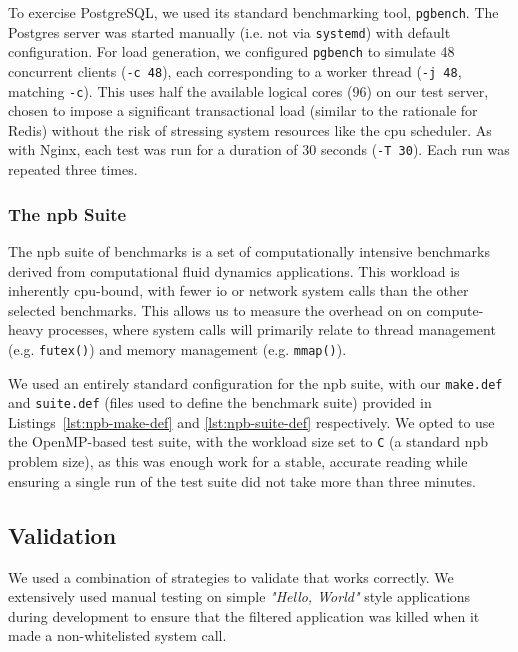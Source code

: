 To exercise PostgreSQL, we used its standard benchmarking tool, 
\texttt{pgbench}. The Postgres server was started manually (i.e. not via
\texttt{systemd}) with default configuration. For load generation, we configured 
\texttt{pgbench} to simulate 48 concurrent clients (\texttt{-c 48}), each
corresponding to a worker thread (\texttt{-j 48}, matching \texttt{-c}).
This uses half the available logical cores (96) on our
test server, chosen to impose a significant transactional load (similar to
the rationale for Redis) without the risk of stressing system resources like the
\ac{cpu} scheduler. As with Nginx, each test was run for a duration of 30
seconds (\texttt{-T 30}). Each run was repeated three times.

\subsubsection{The \ac{npb} Suite}\label{subsubsec:npb-just}

The \acl{npb} suite of benchmarks is a set of computationally intensive 
benchmarks derived from computational fluid dynamics applications. This 
workload is inherently \ac{cpu}-bound, with fewer \ac{io} or network system calls
than the other selected benchmarks. This allows us to measure the
overhead on \af on compute-heavy processes, where system calls will primarily relate
to thread management (e.g. \texttt{futex()}) and memory management (e.g. 
\texttt{mmap()}).

We used an entirely standard configuration for the \ac{npb} suite, with our
\texttt{make.def} and \texttt{suite.def} (files used to define the benchmark
suite) provided in Listings~\ref{lst:npb-make-def} and \ref{lst:npb-suite-def}
respectively. We opted to use the OpenMP-based test suite, with the workload 
size set to \texttt{C} (a standard \ac{npb} problem size), as this was enough 
work for a stable, accurate reading while ensuring a single run of the test 
suite did not take more than three minutes.


\subsection{Validation}\label{subsec:validation}

We used a combination of strategies to validate that \af works correctly. We 
extensively used manual testing on simple \textit{"Hello, World"} style 
applications during development to ensure that the filtered application was 
killed when it made a non-whitelisted system call. 

